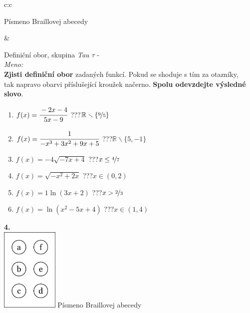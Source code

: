 \documentclass[10pt]{report}
\begin{document}
\begin{tabular}{c:c}
\begin{minipage}[c][99mm][t]{0.49\linewidth}
\begin{center}
\begin{minipage}{0.20\linewidth}
\begin{center}
{\small Písmeno Braillovej abecedy}
\end{center}
\end{minipage}
\end{center}
\end{minipage}
&
\begin{minipage}[c][99mm][t]{0.49\linewidth}
\begin{center}
\vspace{7mm}
{\huge Definiční obor, skupina \textit{Tau $\tau$} -}\\[4.5mm]
\textit{Meno:}\phantom{xxxxxxxxxxxxxxxxxxxxxxxxxxxxxxxxxxxxxxxxxxxxxxxxxxxxxxxxxxxxxxxxx}\\[3.5mm]
\textbf{Zjisti definiční obor} zadaných funkcí. Pokud se shoduje s tím za otazníky,\\tak napravo obarvi příslušející kroužek načerno. \textbf{Spolu odevzdejte výsledné slovo}.\\[3mm]
\begin{minipage}{0.77\linewidth}
\begin{center}
\begin{varwidth}{\textwidth}
\begin{enumerate}
\normalsize
\item $f(x)=\cfrac{-2x-4}{5x-9}$\quad \dotfill\; ???\;\dotfill \quad $\mathbb{R}\smallsetminus\{\nicefrac{9}{5}\}$
\item $f(x)=\cfrac{1}{-x^3+3x^2+9x+5}$\quad \dotfill\; ???\;\dotfill \quad $\mathbb{R}\smallsetminus\{5,-1\}$
\item $f(x)=-4\sqrt{-7x+4}$\quad \dotfill\; ???\;\dotfill \quad $x\leq\nicefrac{4}{7}$
\item $f(x)=\sqrt{-x^2+2x}$\quad \dotfill\; ???\;\dotfill \quad $x\in(0 , 2)$
\item $f(x)=1\ln{(3x+2)}$\quad \dotfill\; ???\;\dotfill \quad $x>\nicefrac{2}{3}$
\item $f(x)=\ln{(x^2-5x+4)}$\quad \dotfill\; ???\;\dotfill \quad $x\in(1 , 4)$
\end{enumerate}
\end{varwidth}
\end{center}
\end{minipage}
\begin{minipage}{0.20\linewidth}
\begin{center}
{\Huge\bfseries 4.} \\[2mm]
\includegraphics[height=40mm]{../images/braille.png}
{\small Písmeno Braillovej abecedy}
\end{center}
\end{minipage}
\end{center}
\end{minipage}
%
\end{tabular}
\end{document}
